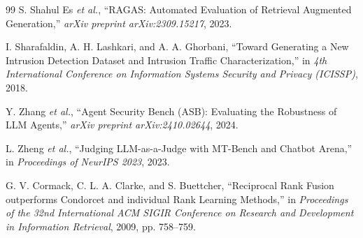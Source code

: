 \documentclass[12pt,a4paper]{article}
\begin{document}
\begin{thebibliography}{99}
    S. Shahul Es \emph{et al.}, ``RAGAS: Automated Evaluation of Retrieval Augmented Generation,'' \emph{arXiv preprint arXiv:2309.15217}, 2023.

    I. Sharafaldin, A. H. Lashkari, and A. A. Ghorbani, ``Toward Generating a New Intrusion Detection Dataset and Intrusion Traffic Characterization,'' in \emph{4th International Conference on Information Systems Security and Privacy (ICISSP)}, 2018.

    Y. Zhang \emph{et al.}, ``Agent Security Bench (ASB): Evaluating the Robustness of LLM Agents,'' \emph{arXiv preprint arXiv:2410.02644}, 2024.

    L. Zheng \emph{et al.}, ``Judging LLM-as-a-Judge with MT-Bench and Chatbot Arena,'' in \emph{Proceedings of NeurIPS 2023}, 2023.

    G. V. Cormack, C. L. A. Clarke, and S. Buettcher, ``Reciprocal Rank Fusion outperforms Condorcet and individual Rank Learning Methods,'' in \emph{Proceedings of the 32nd International ACM SIGIR Conference on Research and Development in Information Retrieval}, 2009, pp. 758--759.

\end{thebibliography}
\end{document}
